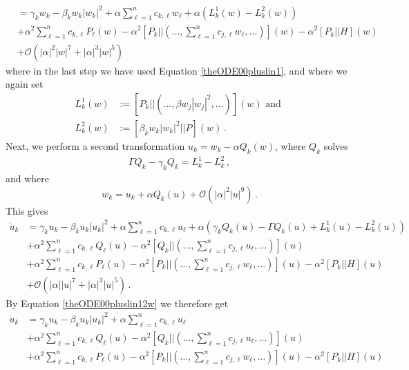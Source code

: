 \documentclass[12pt]{article}
\renewcommand{\mathcal}{\mathscr}
\theoremstyle{plain}
\theoremstyle{definition}
\theoremstyle{remark}
\theoremstyle{remark}
\begin{document}
{\begin{align}
&= \gamma_kw_k - \beta_k w_k|w_k|^2 + \alpha \sum_{\ell =1}^n c_{k,\ell}w_{\ell} +  \alpha(L^1_k(w) - L^2_k(w))  \\ \nonumber
&+\alpha^2\sum_{\ell =1}^n c_{k,\ell}P_{\ell}(w) - \alpha^2[P_k|| (\dots, \sum_{\ell =1}^n c_{j,\ell}w_{\ell}, \dots )](w) - \alpha^2[P_k || H](w) \\ \nonumber
&+ \mathcal{O}(|\alpha|^2|w|^7 + |\alpha|^3|w|^5) 
\end{align}
where in the last step we have used Equation \eqref{theODE00pluslin1}, and where we again set
\begin{align}
L^1_k(w) &:=  [P_k|| (\dots, \beta w_j|w_j|^2, \dots)](w) \text{ and }\\ \nonumber
L^2_k(w) &:=  [\beta_k w_k |w_k|^2|| P](w)\, .
\end{align}
Next, we perform a second transformation $u_k = w_k - \alpha Q_k(w)$, where $Q_k$ solves 
\begin{align}\label{theODE00pluslin12w}
\Gamma Q_k - \gamma_k Q_k = L^1_k - L^2_k\, ,
\end{align}
and where
\begin{equation}\label{invssofw}
    w_k = u_k + \alpha Q_k(u) + \mathcal{O}(|\alpha|^2|u|^9)\, .
\end{equation}
This gives
\begin{align}
\dot{u}_k &= \gamma_ku_k - \beta_k u_k|u_k|^2 + \alpha \sum_{\ell =1}^n c_{k,\ell}u_{\ell} + \alpha (\gamma_kQ_k(u) - \Gamma Q_k(u) + L^1_k(u) - L^2_k(u)) \\ \nonumber
&+  \alpha^2 \sum_{\ell =1}^n c_{k,\ell}Q_{\ell}(u) - \alpha^2[Q_k|| (\dots, \sum_{\ell =1}^n c_{j,\ell}u_{\ell}, \dots )](u)\\ \nonumber
&+\alpha^2\sum_{\ell =1}^n c_{k,\ell}P_{\ell}(u) - \alpha^2[P_k|| (\dots, \sum_{\ell =1}^n c_{j,\ell}w_{\ell}, \dots )](u) - \alpha^2[P_k || H](u) \\ \nonumber
&+ \mathcal{O}(|\alpha||u|^7 + |\alpha|^3|u|^5) \, .
\end{align}
By Equation \eqref{theODE00pluslin12w} we therefore get
\begin{align}\label{lastofabstra}
\dot{u}_k &= \gamma_ku_k - \beta_k u_k|u_k|^2 + \alpha \sum_{\ell =1}^n c_{k,\ell}u_{\ell}  \\ \nonumber
&+  \alpha^2 \sum_{\ell =1}^n c_{k,\ell}Q_{\ell}(u) - \alpha^2[Q_k|| (\dots, \sum_{\ell =1}^n c_{j,\ell}u_{\ell}, \dots )](u)\\ \nonumber
&+\alpha^2\sum_{\ell =1}^n c_{k,\ell}P_{\ell}(u) - \alpha^2[P_k|| (\dots, \sum_{\ell =1}^n c_{j,\ell}w_{\ell}, \dots )](u) - \alpha^2[P_k || H](u) \\ \nonumber

\end{align}}
\end{document}
